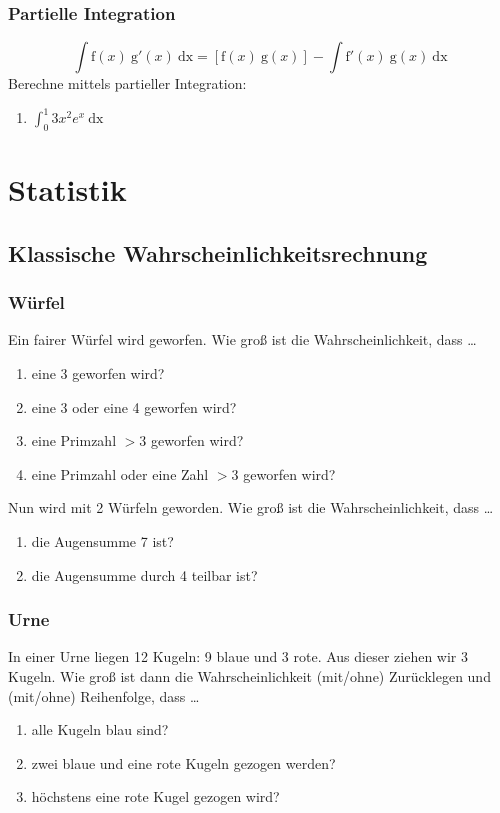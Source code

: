 \documentclass[11pt, a4paper]{article}
\newcommand{\dx}{\ \mathrm{dx}}
\begin{document}
\subsubsection{Partielle Integration}
\[ \int \mathrm{f}(x) \ \mathrm{g}'(x) \dx = \left[ \mathrm{f}(x) \ \mathrm{g}(x) \right] - \int \mathrm{f}'(x) \ \mathrm{g}(x) \dx \]
Berechne mittels partieller Integration:
\begin{enumerate}
	\item $\int_0^1 3x^2 e^x \dx$
\end{enumerate}

\newpage
\section{Statistik}
\subsection{Klassische Wahrscheinlichkeitsrechnung}
\subsubsection{Würfel}
Ein fairer Würfel wird geworfen. Wie groß ist die Wahrscheinlichkeit, dass \dots
\begin{enumerate}
	\item eine 3 geworfen wird?
	\item eine 3 oder eine 4 geworfen wird?
	\item eine Primzahl $> 3$ geworfen wird?
	\item eine Primzahl oder eine Zahl $> 3$ geworfen wird?
\end{enumerate}
Nun wird mit 2 Würfeln geworden. Wie groß ist die Wahrscheinlichkeit, dass \dots
\begin{enumerate}
	\item die Augensumme 7 ist?
	\item die Augensumme durch 4 teilbar ist?
\end{enumerate}

\subsubsection{Urne}
In einer Urne liegen 12 Kugeln: 9 blaue und 3 rote. Aus dieser ziehen wir 3 Kugeln. Wie groß ist dann die Wahrscheinlichkeit (mit/ohne) Zurücklegen und (mit/ohne) Reihenfolge, dass \dots
\begin{enumerate}
	\item alle Kugeln blau sind?
	\item zwei blaue und eine rote Kugeln gezogen werden?
	\item höchstens eine rote Kugel gezogen wird?
\end{enumerate}
\end{document}
